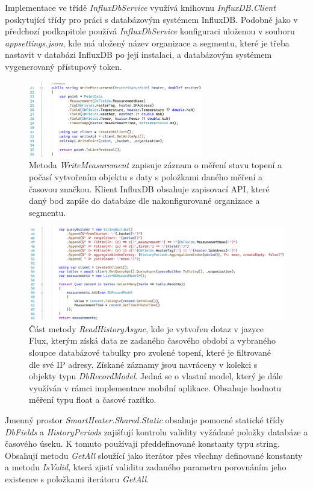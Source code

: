 Implementace ve třídě {\it InfluxDbService} využívá knihovnu {\it InfluxDB.Client} poskytující třídy pro práci s databázovým systémem InfluxDB. Podobně jako v předchozí podkapitole používá {\it InfluxDbService} konfiguraci uloženou v souboru {\it appsettings.json}, kde má uložený název organizace a segmentu, které je třeba nastavit v databázi InfluxDB po její instalaci, a databázovým systémem vygenerovaný přístupový token.

\begin{figure}[hbt]
\includegraphics[width=0.68\textwidth]{obrazky-figures/code-influx-write.png}
\caption{Metoda {\it WriteMeasurement} zapisuje záznam o měření stavu topení a počasí vytvořením objektu s daty s položkami daného měření a časovou značkou. Klient InfluxDB obsahuje zapisovací API, které daný bod zapíše do databáze dle nakonfigurované organizace a segmentu.}
\end{figure}

\begin{figure}[hbt]
\includegraphics[width=1.05\textwidth]{obrazky-figures/code-influx-read.png}
\caption{Část metody {\it ReadHistoryAsync}, kde je vytvořen dotaz v jazyce Flux, kterým získá data ze zadaného časového období a vybraného sloupce databázové tabulky pro zvolené topení, které je filtrované dle své IP adresy. Získané záznamy jsou navráceny v kolekci s objekty typu {\it DbRecordModel}. Jedná se o vlastní model, který je dále využíván v rámci implementace mobilní aplikace. Obsahuje hodnotu měření typu float a časové razítko.}
\end{figure}

\pagebreak
Jmenný prostor {\it SmartHeater.Shared.Static} obsahuje pomocné statické třídy {\it DbFields} a {\it HistoryPeriods} zajišťují kontrolu validity vyžádané položky databáze a časového úseku. K tomuto používají předdefinované konstanty typu string. Obsahují metodu {\it GetAll} sloužící jako iterátor přes všechny definované konstanty a metodu {\it IsValid}, která zjistí validitu zadaného parametru porovnáním jeho existence s položkami iterátoru {\it GetAll}.

